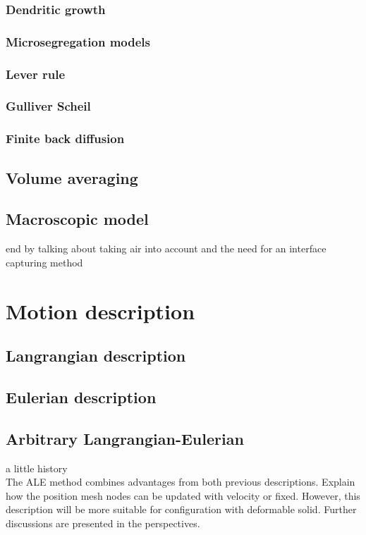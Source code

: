\subsubsection{Dendritic growth}

\subsubsection{Microsegregation models}
\subsubsection*{Lever rule}
\subsubsection*{Gulliver Scheil}
\subsubsection*{Finite back diffusion}


\subsection{Volume averaging}


\subsection{Macroscopic model}
end by talking about taking air into account and the need for an interface capturing method


\section{Motion description}
\subsection{Langrangian description}
\subsection{Eulerian description}
\subsection{Arbitrary Langrangian-Eulerian}
a little history \citep{hirt_arbitrary_1971} \\ 
The ALE method combines advantages from both previous descriptions. Explain how the position mesh nodes can be
updated with velocity or fixed. However, this description will be more suitable for configuration with deformable solid. 
Further discussions are presented in the perspectives.


